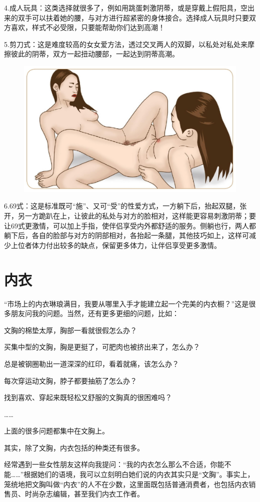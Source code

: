 \documentclass[12pt,UTF8]{ctexbook}
\begin{document}
4.成人玩具：这类选择就很多了，例如用跳蛋刺激阴蒂，或是穿戴上假阳具，空出来的双手可以扶着她的腰，与对方进行超紧密的身体接合。选择成人玩具时只要双方喜欢，样式不必受限，只要能帮助你们达到高潮！

5.剪刀式：这是难度较高的女女爱方法，透过交叉两人的双脚，以私处对私处来摩擦彼此的阴蒂，双方一起扭动腰部，一起达到阴蒂高潮。

\begin{figure}[H]
	\centering
	\includegraphics[width=0.7\linewidth]{12}
	\caption{}
	\label{fig:1}
\end{figure}

6.69式：这是标准既可“施”、又可“受”的性爱方式，一方躺下后，抬起双腿，张开，另一方跪趴在上，让彼此的私处与对方的脸相对，这样能更容易刺激阴蒂；要让69式更激情，可以加上手指，使伴侣享受内外都舒适的服务。侧躺也行，两人都躺下后，各自的脸部与对方的阴部相对，各抬起一条腿，其他技巧如上，这样可减少上位者体力付出较多的缺点，保留更多体力，让伴侣享受更多激情。


\part{内衣}

“市场上的内衣琳琅满目，我要从哪里入手才能建立起一个完美的内衣橱？”这是很多朋友问我的问题。当然，还有更多更细的问题，比如：

文胸的棉垫太厚，胸部一看就很假怎么办？

买集中型的文胸，胸是更挺了，可肥肉也被挤出来了，怎么办？

总是被钢圈勒出一道深深的红印，看着就痛，该怎么办？

每次穿运动文胸，脖子都要抽筋了怎么办？

找到喜欢、穿起来既轻松又舒服的文胸真的很困难吗？

……

上面的很多问题都集中在文胸上。


其实，除了文胸，内衣包括的种类还有很多。

经常遇到一些女性朋友这样向我提问：“我的内衣怎么那么不合适，你能不能……”根据她们的语境，我可以立刻明白她们说的内衣其实只是“文胸”。事实上，笼统地把文胸叫做“内衣”的人不在少数，这里面既包括普通消费者，也包括内衣销售员、时尚杂志编辑，甚至我们内衣工作者。
\end{document}
